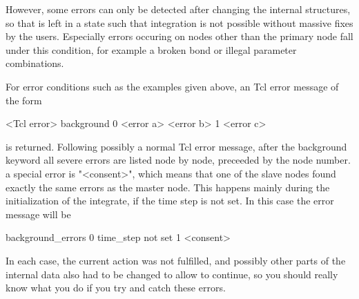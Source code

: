 However, some errors can only be detected after changing the internal
structures, so that \es{} is left in a state such that integration is
not possible without massive fixes by the users. Especially errors
occuring on nodes other than the primary node fall under this
condition, for example a broken bond or illegal parameter
combinations.

For error conditions such as the examples given above, an Tcl error
message of the form
\begin{tclcode}
<Tcl error> background 0 {<error a>} {<error b>} 1 {<error c>}
\end{tclcode}
is returned. Following possibly a normal Tcl error message, after the
background keyword all severe errors are listed node by node,
preceeded by the node number. a special error is "<consent>", which
means that one of the slave nodes found exactly the same errors as the
master node. This happens mainly during the initialization of the
integrate, \eg if the time step is not set. In this case the error
message will be
\begin{tclcode}
background_errors 0 {time_step not set} 1 <consent> 
\end{tclcode}
In each case, the current action was not fulfilled, and possibly other
parts of the internal data also had to be changed to allow \es{} to
continue, so you should really know what you do if you try and catch
these errors.


